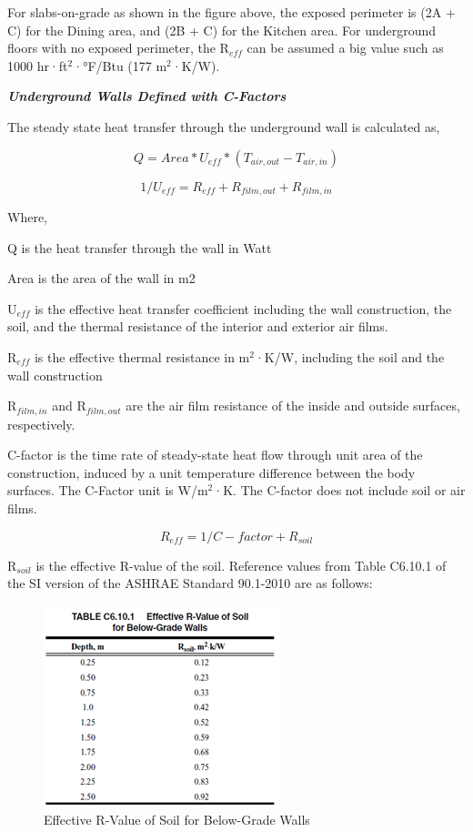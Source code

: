 For slabs-on-grade as shown in the figure above, the exposed perimeter is (2A + C) for the Dining area, and (2B + C) for the Kitchen area. For underground floors with no exposed perimeter, the R\(_{eff}\) can be assumed a big value such as 1000 hr·ft\(^{2}\)·°F/Btu (177 m\(^{2}\)·K/W).

\textbf{\emph{Underground Walls Defined with C-Factors}}

The steady state heat transfer through the underground wall is calculated as,

\begin{equation}
Q = Area * U_{eff} * (T_{air,out} - T_{air,in})
\end{equation}

\begin{equation}
1 / U_{eff} = R_{eff} + R_{film,out} + R_{film,in}
\end{equation}

Where,

Q is the heat transfer through the wall in Watt

Area is the area of the wall in m2

U\(_{eff}\) is the effective heat transfer coefficient including the wall construction, the soil, and the thermal resistance of the interior and exterior air films.

R\(_{eff}\) is the effective thermal resistance in m\(^{2}\)·K/W, including the soil and the wall construction

R\(_{film,in}\) and R\(_{film,out}\) are the air film resistance of the inside and outside surfaces, respectively.

C-factor is the time rate of steady-state heat flow through unit area of the construction, induced by a unit temperature difference between the body surfaces. The C-Factor unit is W/m\(^{2}\)·K. The C-factor does not include soil or air films.

\begin{equation}
R_{eff} = 1/C-factor + R_{soil}
\end{equation}

R\(_{soil}\) is the effective R-value of the soil. Reference values from Table C6.10.1 of the SI version of the ASHRAE Standard 90.1-2010 are as follows:

\begin{figure}[htbp]
\centering
\includegraphics{media/image436.png}
\caption{Effective R-Value of Soil for Below-Grade Walls}
\end{figure}

